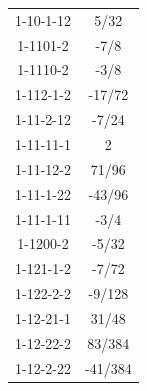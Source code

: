 \begin{tabular}[t]{|cc|}
1-10-1-12 &  5/32\\
1-1101-2 &  -7/8\\
1-1110-2 &  -3/8\\
1-112-1-2 &  -17/72\\
1-11-2-12 &  -7/24\\
1-11-11-1 &  2\\
1-11-12-2 &  71/96\\
1-11-1-22 &  -43/96\\
1-11-1-11 &  -3/4\\
1-1200-2 &  -5/32\\
1-121-1-2 &  -7/72\\
1-122-2-2 &  -9/128\\
1-12-21-1 &  31/48\\
1-12-22-2 &  83/384\\
1-12-2-22 &  -41/384\\
\hline
\end{tabular}
